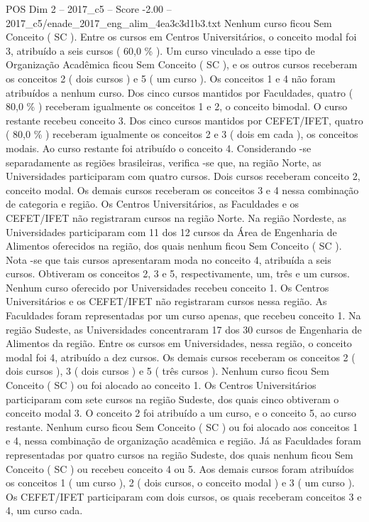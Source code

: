 \begin{textsample}{POS Dim 2 – 2017\_c5 – Score -2.00 – 2017\_c5/enade\_2017\_eng\_alim\_4ea3c3d1b3.txt}
Nenhum curso ficou Sem Conceito ( SC ).
Entre os cursos em Centros Universitários, o conceito modal foi 3, atribuído a seis cursos ( 60,0 \% ).
Um curso vinculado a esse tipo de Organização Acadêmica ficou Sem Conceito ( SC ), e os outros cursos receberam os conceitos 2 ( dois cursos ) e 5 ( um curso ).
Os conceitos 1 e 4 não foram atribuídos a nenhum curso.
Dos cinco cursos mantidos por Faculdades, quatro ( 80,0 \% ) receberam igualmente os conceitos 1 e 2, o conceito bimodal.
O curso restante recebeu conceito 3.
Dos cinco cursos mantidos por CEFET/IFET, quatro ( 80,0 \% ) receberam igualmente os conceitos 2 e 3 ( dois em cada ), os conceitos modais.
Ao curso restante foi atribuído o conceito 4.
Considerando -se separadamente as regiões brasileiras, verifica -se que, na região Norte, as Universidades participaram com quatro cursos.
Dois cursos receberam conceito 2, conceito modal.
Os demais cursos receberam os conceitos 3 e 4 nessa combinação de categoria e região.
Os Centros Universitários, as Faculdades e os CEFET/IFET não registraram cursos na região Norte.
Na região Nordeste, as Universidades participaram com 11 dos 12 cursos da Área de Engenharia de Alimentos oferecidos na região, dos quais nenhum ficou Sem Conceito ( SC ).
Nota -se que tais cursos apresentaram moda no conceito 4, atribuída a seis cursos.
Obtiveram os conceitos 2, 3 e 5, respectivamente, um, três e um cursos.
Nenhum curso oferecido por Universidades recebeu conceito 1.
Os Centros Universitários e os CEFET/IFET não registraram cursos nessa região.
As Faculdades foram representadas por um curso apenas, que recebeu conceito 1.
Na região Sudeste, as Universidades concentraram 17 dos 30 cursos de Engenharia de Alimentos da região.
Entre os cursos em Universidades, nessa região, o conceito modal foi 4, atribuído a dez cursos.
Os demais cursos receberam os conceitos 2 ( dois cursos ), 3 ( dois cursos ) e 5 ( três cursos ).
Nenhum curso ficou Sem Conceito ( SC ) ou foi alocado ao conceito 1.
Os Centros Universitários participaram com sete cursos na região Sudeste, dos quais cinco obtiveram o conceito modal 3.
O conceito 2 foi atribuído a um curso, e o conceito 5, ao curso restante.
Nenhum curso ficou Sem Conceito ( SC ) ou foi alocado aos conceitos 1 e 4, nessa combinação de organização acadêmica e região.
Já as Faculdades foram representadas por quatro cursos na região Sudeste, dos quais nenhum ficou Sem Conceito ( SC ) ou recebeu conceito 4 ou 5.
Aos demais cursos foram atribuídos os conceitos 1 ( um curso ), 2 ( dois cursos, o conceito modal ) e 3 ( um curso ).
Os CEFET/IFET participaram com dois cursos, os quais receberam conceitos 3 e 4, um curso cada.

\end{textsample}
